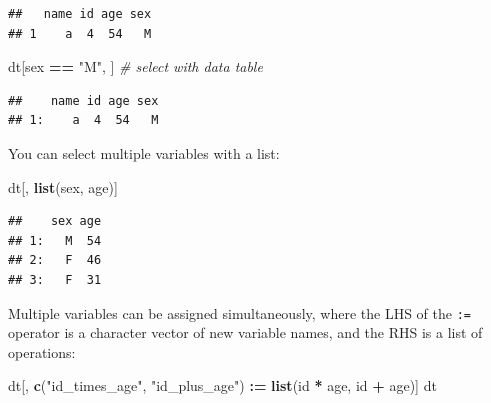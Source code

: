 \documentclass[
]{book}
\newenvironment{Shaded}{\begin{snugshade}}{\end{snugshade}}
\newcommand{\CommentTok}[1]{\textcolor[rgb]{0.56,0.35,0.01}{\textit{#1}}}
\newcommand{\FunctionTok}[1]{\textcolor[rgb]{0.13,0.29,0.53}{\textbf{#1}}}
\newcommand{\NormalTok}[1]{#1}
\newcommand{\OtherTok}[1]{\textcolor[rgb]{0.56,0.35,0.01}{#1}}
\newcommand{\SpecialCharTok}[1]{\textcolor[rgb]{0.81,0.36,0.00}{\textbf{#1}}}
\newcommand{\StringTok}[1]{\textcolor[rgb]{0.31,0.60,0.02}{#1}}
\begin{document}
\begin{verbatim}
##   name id age sex
## 1    a  4  54   M
\end{verbatim}

\begin{Shaded}
\begin{Highlighting}[]
\NormalTok{dt[sex }\SpecialCharTok{==} \StringTok{"M"}\NormalTok{, ] }\CommentTok{\# select with data table}
\end{Highlighting}
\end{Shaded}

\begin{verbatim}
##    name id age sex
## 1:    a  4  54   M
\end{verbatim}

\begin{Shaded}
\end{Shaded}

You can select multiple variables with a list:

\begin{Shaded}
\begin{Highlighting}[]
\NormalTok{dt[, }\FunctionTok{list}\NormalTok{(sex, age)]}
\end{Highlighting}
\end{Shaded}

\begin{verbatim}
##    sex age
## 1:   M  54
## 2:   F  46
## 3:   F  31
\end{verbatim}

Multiple variables can be assigned simultaneously, where the LHS of the \texttt{:=} operator is a character vector of new variable names, and the RHS is a list of operations:

\begin{Shaded}
\begin{Highlighting}[]
\NormalTok{dt[, }\FunctionTok{c}\NormalTok{(}\StringTok{"id\_times\_age"}\NormalTok{, }\StringTok{"id\_plus\_age"}\NormalTok{) }\SpecialCharTok{:=} \FunctionTok{list}\NormalTok{(id }\SpecialCharTok{*}\NormalTok{ age, id }\SpecialCharTok{+}\NormalTok{ age)]}
\NormalTok{dt}
\end{Highlighting}
\end{Shaded}
\end{document}
